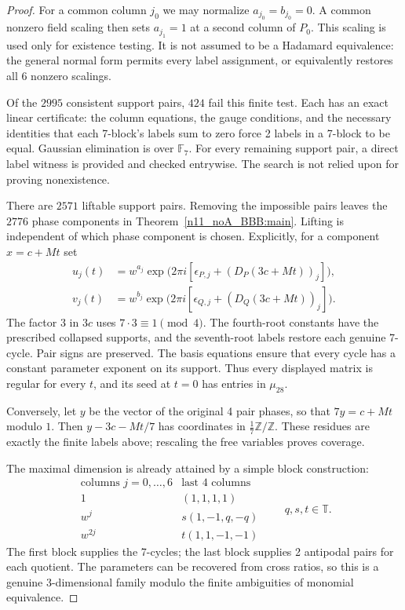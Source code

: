 \documentclass[11pt,a4paper]{article}
\theoremstyle{plain}
\theoremstyle{definition}
\theoremstyle{plain}
\begin{document}
\begin{proof}
For a common column $j_0$ we may normalize $a_{j_0}=b_{j_0}=0$. A common nonzero field scaling then sets $a_{j_1}=1$ at a second column of $P_0$. This scaling is used only for existence testing. It is not assumed to be a Hadamard equivalence: the general normal form permits every label assignment, or equivalently restores all 6 nonzero scalings.

Of the $2995$ consistent support pairs, $424$ fail this finite test. Each has an exact linear certificate: the column equations, the gauge conditions, and the necessary identities that each 7-block's labels sum to zero force 2 labels in a 7-block to be equal. Gaussian elimination is over $\mathbb{F}_7$. For every remaining support pair, a direct label witness is provided and checked entrywise. The search is not relied upon for proving nonexistence.

There are $2571$ liftable support pairs. Removing the impossible pairs leaves the $2776$ phase components in Theorem~\ref{n11_noA_BBB:main}. Lifting is independent of which phase component is chosen. Explicitly, for a component $x=c+Mt$ set
\begin{align*}
u_j(t)&=w^{a_j}\exp\bigl(2\pi i[\epsilon_{P,j}+(D_P(3c+Mt))_j]\bigr),\\
v_j(t)&=w^{b_j}\exp\bigl(2\pi i[\epsilon_{Q,j}+(D_Q(3c+Mt))_j]\bigr).
\end{align*}
The factor $3$ in $3c$ uses $7\cdot3\equiv1\pmod4$. The fourth-root constants have the prescribed collapsed supports, and the seventh-root labels restore each genuine 7-cycle. Pair signs are preserved. The basis equations ensure that every cycle has a constant parameter exponent on its support. Thus every displayed matrix is regular for every $t$, and its seed at $t=0$ has entries in $\mu_{28}$.

Conversely, let $y$ be the vector of the original 4 pair phases, so that $7y=c+Mt$ modulo $1$. Then $y-3c-Mt/7$ has coordinates in $\frac17\mathbb Z/\mathbb Z$. These residues are exactly the finite labels above; rescaling the free variables proves coverage.

\medskip
The maximal dimension is already attained by a simple block construction:
$$\begin{array}{c|c}
\text{columns }j=0,\ldots,6&\text{last 4 columns}\\\hline
1&(1,1,1,1)\\
w^{j}&s(1,-1,q,-q)\\
w^{2j}&t(1,1,-1,-1)
\end{array}
\qquad q,s,t\in\mathbb{T}.$$
The first block supplies the 7-cycles; the last block supplies 2 antipodal pairs for each quotient. The parameters can be recovered from cross ratios, so this is a genuine 3-dimensional family modulo the finite ambiguities of monomial equivalence.
\end{proof}
\end{document}

